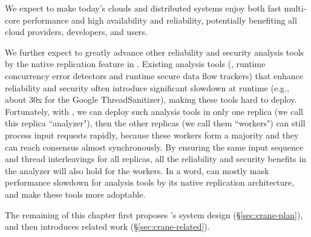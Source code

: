 We expect \crane to make today's clouds and distributed systems enjoy both
fast multi-core performance and high availability and reliability, potentially
benefiting all cloud providers, developers, and users.

We further expect \crane to greatly advance other reliability and security
analysis tools by the native replication feature in \crane. Existing analysis
tools (\eg, runtime concurrency error detectors and runtime secure data flow
trackers) that enhance reliability and security often introduce significant
slowdown at runtime (e.g., about 30x for the Google ThreadSanitizer), making
these tools hard to deploy. Fortunately, with \crane, we can deploy such
analysis tools in only one replica (we call this replica ``analyzer"), then the
other replicas (we call them ``workers") can still process input requests
rapidly, because these workers form a majority and they can reach consensus
almost synchronously. By ensuring the same input sequence and thread
interleavings for all replicas, all the reliability and security benefits in the
analyzer will also hold for the workers. In a word, \crane can mostly mask
performance slowdown for analysis tools by its native replication architecture,
and make these tools more adoptable.

The remaining of this chapter first proposes \crane's system
design (\S\ref{sec:crane-plan}), and then introduces related
work (\S\ref{sec:crane-related}).
